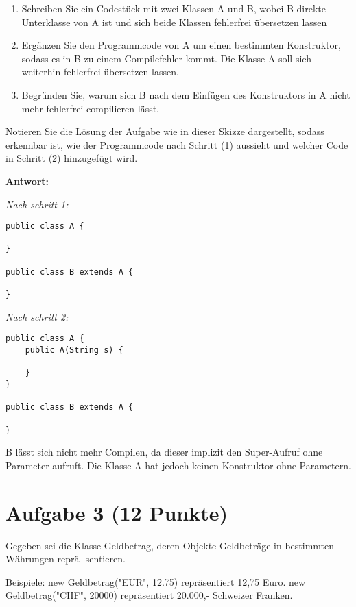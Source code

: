 \begin{enumerate}
    \item Schreiben Sie ein Codestück mit zwei Klassen A und B, wobei B direkte
          Unterklasse von A ist und sich beide Klassen fehlerfrei übersetzen lassen
    \item Ergänzen Sie den Programmcode von A um einen bestimmten Konstruktor, sodass es
          in B zu einem Compilefehler kommt. Die Klasse A soll sich weiterhin fehlerfrei
          übersetzen lassen.
    \item Begründen Sie, warum sich B nach dem Einfügen des Konstruktors in A nicht mehr
          fehlerfrei compilieren lässt.
\end{enumerate}

Notieren Sie die Lösung der Aufgabe wie in dieser Skizze dargestellt, sodass
erkennbar ist, wie der Programmcode nach Schritt (1) aussieht und welcher Code
in Schritt (2) hinzugefügt wird.

\textbf{Antwort:}

\textit{Nach schritt 1:}

\begin{lstlisting}
public class A {

}

public class B extends A {

}
\end{lstlisting}

\textit{Nach schritt 2:}

\begin{lstlisting}
public class A {
    public A(String s) {

    }
}

public class B extends A {

}
\end{lstlisting}

B lässt sich nicht mehr Compilen, da dieser implizit den Super-Aufruf ohne
Parameter aufruft. Die Klasse A hat jedoch keinen Konstruktor ohne Parametern.

\section{Aufgabe 3 (12 Punkte)}

Gegeben sei die Klasse Geldbetrag, deren Objekte Geldbeträge in bestimmten
Währungen reprä- sentieren.

Beispiele: new Geldbetrag("EUR", 12.75) repräsentiert 12,75 Euro. new
Geldbetrag("CHF", 20000) repräsentiert 20.000,- Schweizer Franken.

